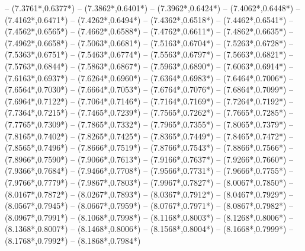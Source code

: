 {	-- ({7.3761*\dx},{0.6377*\dy})
	-- ({7.3862*\dx},{0.6401*\dy})
	-- ({7.3962*\dx},{0.6424*\dy})
	-- ({7.4062*\dx},{0.6448*\dy})
	-- ({7.4162*\dx},{0.6471*\dy})
	-- ({7.4262*\dx},{0.6494*\dy})
	-- ({7.4362*\dx},{0.6518*\dy})
	-- ({7.4462*\dx},{0.6541*\dy})
	-- ({7.4562*\dx},{0.6565*\dy})
	-- ({7.4662*\dx},{0.6588*\dy})
	-- ({7.4762*\dx},{0.6611*\dy})
	-- ({7.4862*\dx},{0.6635*\dy})
	-- ({7.4962*\dx},{0.6658*\dy})
	-- ({7.5063*\dx},{0.6681*\dy})
	-- ({7.5163*\dx},{0.6704*\dy})
	-- ({7.5263*\dx},{0.6728*\dy})
	-- ({7.5363*\dx},{0.6751*\dy})
	-- ({7.5463*\dx},{0.6774*\dy})
	-- ({7.5563*\dx},{0.6797*\dy})
	-- ({7.5663*\dx},{0.6821*\dy})
	-- ({7.5763*\dx},{0.6844*\dy})
	-- ({7.5863*\dx},{0.6867*\dy})
	-- ({7.5963*\dx},{0.6890*\dy})
	-- ({7.6063*\dx},{0.6914*\dy})
	-- ({7.6163*\dx},{0.6937*\dy})
	-- ({7.6264*\dx},{0.6960*\dy})
	-- ({7.6364*\dx},{0.6983*\dy})
	-- ({7.6464*\dx},{0.7006*\dy})
	-- ({7.6564*\dx},{0.7030*\dy})
	-- ({7.6664*\dx},{0.7053*\dy})
	-- ({7.6764*\dx},{0.7076*\dy})
	-- ({7.6864*\dx},{0.7099*\dy})
	-- ({7.6964*\dx},{0.7122*\dy})
	-- ({7.7064*\dx},{0.7146*\dy})
	-- ({7.7164*\dx},{0.7169*\dy})
	-- ({7.7264*\dx},{0.7192*\dy})
	-- ({7.7364*\dx},{0.7215*\dy})
	-- ({7.7465*\dx},{0.7239*\dy})
	-- ({7.7565*\dx},{0.7262*\dy})
	-- ({7.7665*\dx},{0.7285*\dy})
	-- ({7.7765*\dx},{0.7309*\dy})
	-- ({7.7865*\dx},{0.7332*\dy})
	-- ({7.7965*\dx},{0.7355*\dy})
	-- ({7.8065*\dx},{0.7379*\dy})
	-- ({7.8165*\dx},{0.7402*\dy})
	-- ({7.8265*\dx},{0.7425*\dy})
	-- ({7.8365*\dx},{0.7449*\dy})
	-- ({7.8465*\dx},{0.7472*\dy})
	-- ({7.8565*\dx},{0.7496*\dy})
	-- ({7.8666*\dx},{0.7519*\dy})
	-- ({7.8766*\dx},{0.7543*\dy})
	-- ({7.8866*\dx},{0.7566*\dy})
	-- ({7.8966*\dx},{0.7590*\dy})
	-- ({7.9066*\dx},{0.7613*\dy})
	-- ({7.9166*\dx},{0.7637*\dy})
	-- ({7.9266*\dx},{0.7660*\dy})
	-- ({7.9366*\dx},{0.7684*\dy})
	-- ({7.9466*\dx},{0.7708*\dy})
	-- ({7.9566*\dx},{0.7731*\dy})
	-- ({7.9666*\dx},{0.7755*\dy})
	-- ({7.9766*\dx},{0.7779*\dy})
	-- ({7.9867*\dx},{0.7803*\dy})
	-- ({7.9967*\dx},{0.7827*\dy})
	-- ({8.0067*\dx},{0.7850*\dy})
	-- ({8.0167*\dx},{0.7872*\dy})
	-- ({8.0267*\dx},{0.7893*\dy})
	-- ({8.0367*\dx},{0.7912*\dy})
	-- ({8.0467*\dx},{0.7929*\dy})
	-- ({8.0567*\dx},{0.7945*\dy})
	-- ({8.0667*\dx},{0.7959*\dy})
	-- ({8.0767*\dx},{0.7971*\dy})
	-- ({8.0867*\dx},{0.7982*\dy})
	-- ({8.0967*\dx},{0.7991*\dy})
	-- ({8.1068*\dx},{0.7998*\dy})
	-- ({8.1168*\dx},{0.8003*\dy})
	-- ({8.1268*\dx},{0.8006*\dy})
	-- ({8.1368*\dx},{0.8007*\dy})
	-- ({8.1468*\dx},{0.8006*\dy})
	-- ({8.1568*\dx},{0.8004*\dy})
	-- ({8.1668*\dx},{0.7999*\dy})
	-- ({8.1768*\dx},{0.7992*\dy})
	-- ({8.1868*\dx},{0.7984*\dy})
}
